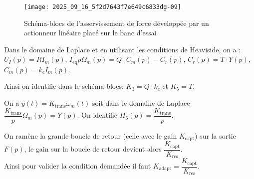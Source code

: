 \begin{figure}[!h]
\centering
\texttt{[image: 2025\_09\_16\_5f2d7643f7e649c6833dg-09]}
\caption{\label{ccs_mp_2023_fig_11}  Schéma-blocs de l'asservissement de force développée par un actionneur linéaire placé sur le banc d'essai}
\end{figure}

\fi


\ifprof
\begin{corrige}
Dans le domaine de Laplace et en utilisant les conditions de Heaviside, on a :
$U_I(p) = R I_m(p)$, 
$I_{\text{eq}}p \Omega_m(p) = Q \cdot C_m(p) - C_r(p)$, 
$C_r(p) = T \cdot Y(p)$, 
$C_m(p) = k_c I_m(p)$.


Ainsi on identifie dans le schéma-blocs: $\boxed{K_3 = Q \cdot k_c}$ et $\boxed{K_5 = T}$.
\end{corrige}
\else
\fi

\ifprof
\begin{corrige}
On a $\dot{y}(t) = K_{\text{trans}} \omega_m(t)$ soit dans le domaine de Laplace $\dfrac{K_{\text{trans}}}{p} \Omega_m(p) = Y(p)$. On identifie $\boxed{H_6(p)=\dfrac{K_{\text{trans}}}{p}}$.
\end{corrige}
\else
\fi


\ifprof
\begin{corrige}
On ramène la grande boucle de retour (celle avec le gain $K_{\text{capt}}$) sur la sortie $F(p)$, le gain sur la boucle de retour devient alors $\dfrac{K_{\text{capt}}}{K_{\text{res}}}$.\\

Ainsi pour valider la condition demandée il faut $\boxed{K_{\text{adapt}} = \dfrac{K_{\text{capt}}}{K_{\text{res}}}}$.


\end{corrige}
\else
\fi



